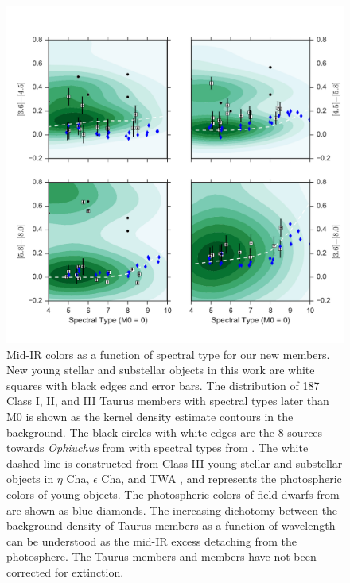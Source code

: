 \begin{figure}[ht!]
  \caption{ Mid-IR colors as a function of spectral type for our new members.  New young stellar and substellar objects in this work are white squares with black edges and error bars.  The distribution of 187 Class I, II, and III Taurus members with spectral types later than M0 \citep{2010ApJS..186..111L} is shown as the kernel density estimate contours in the background.  The black circles with white edges are the 8 sources towards \emph{Ophiuchus} from \citet{allers06} with spectral types from \citet{2011ASPC..448..633G}.  The white dashed line is constructed from Class III young stellar and substellar objects in $\eta$ Cha, $\epsilon$ Cha, and TWA \citep{2010ApJS..186..111L}, and represents the photospheric colors of young objects.  The photospheric colors of field dwarfs from \citet{2006ApJ...651..502P} are shown as blue diamonds. 
  The increasing dichotomy between the background density of Taurus members as a function of wavelength can be understood as the mid-IR excess detaching from the photosphere.  The Taurus members and \citet{allers06} members have not been corrected for extinction.  \label{fig_midIR_results} }
\centering
\includegraphics[scale=0.6]{chIMACS/figures/midIR_phot_results.pdf}
\end{figure}

